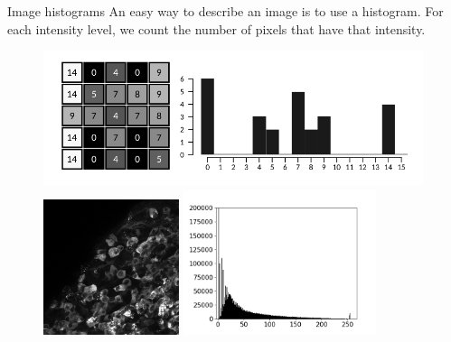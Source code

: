 \documentclass[9pt, aspectratio=169]{beamer}
\begin{document}
\begin{frame}
	{Image histograms}
	An easy way to describe an image is to use a histogram. For each intensity level, we count the number of pixels that have that intensity.

	\begin{figure}
		\centering
		{
			\includegraphics[height=150px]{simple_histogram.png}
		}
		\only<2>
		{
			\includegraphics[height=150px]{cellshisto.png}
			\includegraphics[height=160px]{histo.png}
		}
	\end{figure}
\end{frame}
\end{document}
